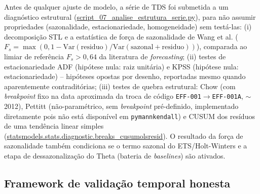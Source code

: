 Antes de qualquer ajuste de modelo, a série de TDS foi submetida a um diagnóstico estrutural (\url{script_07_analise_estrutura_serie.py}), para não assumir propriedades (sazonalidade, estacionariedade, homogeneidade) sem testá-las: (i) decomposição STL e a estatística de força de sazonalidade de Wang et al. ($F_s = \max(0, 1 - \mathrm{Var}(\mathrm{residuo})/\mathrm{Var}(\mathrm{sazonal}+\mathrm{residuo}))$), comparada ao limiar de referência $F_s > 0{,}64$ da literatura de \textit{forecasting}; (ii) testes de estacionariedade ADF (hipótese nula: raiz unitária) e KPSS (hipótese nula: estacionariedade) -- hipóteses opostas por desenho, reportadas mesmo quando aparentemente contraditórias; (iii) testes de quebra estrutural: Chow (com \textit{breakpoint} fixo na data aproximada da troca de código \texttt{EFF-001}$\to$\texttt{EFF-001A}, $\sim$2012), Pettitt (não-paramétrico, sem \textit{breakpoint} pré-definido, implementado diretamente pois não está disponível em \texttt{pymannkendall}) e CUSUM dos resíduos de uma tendência linear simples (\url{statsmodels.stats.diagnostic.breaks_cusumolsresid}). O resultado da força de sazonalidade também condiciona se o termo sazonal do ETS/Holt-Winters e a etapa de dessazonalização do Theta (bateria de \textit{baselines}) são ativados.

\subsection{Framework de validação temporal honesta}

